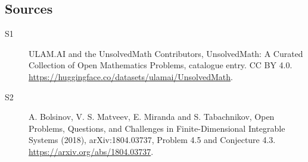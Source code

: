 \documentclass[11pt]{article}
\begin{document}
\subsection{Sources}
\begin{description}
\item[\hypertarget{source:statement:1}{S1}] ULAM.AI and the UnsolvedMath Contributors, UnsolvedMath: A Curated Collection of Open Mathematics Problems, catalogue entry. CC BY 4.0. \url{https://huggingface.co/datasets/ulamai/UnsolvedMath}.
\item[\hypertarget{source:statement:2}{S2}] A. Bolsinov, V. S. Matveev, E. Miranda and S. Tabachnikov, Open Problems, Questions, and Challenges in Finite-Dimensional Integrable Systems (2018), arXiv:1804.03737, Problem 4.5 and Conjecture 4.3. \url{https://arxiv.org/abs/1804.03737}.
\end{description}
\label{end:statement}
\end{document}
